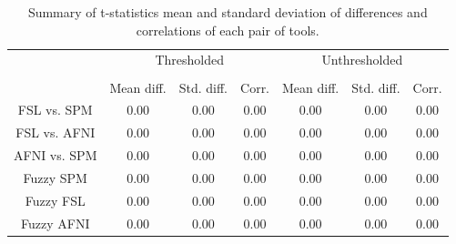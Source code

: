 \documentclass[runningheads]{llncs}
\begin{document}
\setlength{\tabcolsep}{10pt}
\begin{table}[h]
    \centering
    \begin{tabular}{cccc|ccc}
        \toprule
        \multirow{2}{*}{} & \multicolumn{3}{c}{Thresholded} & \multicolumn{3}{c}{Unthresholded} \\
        \cmidrule{2-4} \cmidrule{5-7} \\
        {} & Mean diff. & Std. diff. & Corr. & Mean diff. & Std. diff. & Corr.  \\
        \midrule
        \rowcolor{lightgray}
        FSL vs. SPM          &  0.00       & 0.00      & 0.00       & 0.00     & 0.00       & 0.00 \\
        \rowcolor{lightgray}
        FSL vs. AFNI         &  0.00       & 0.00      & 0.00       & 0.00     & 0.00       & 0.00 \\
        \rowcolor{lightgray}
        AFNI vs. SPM         &  0.00       & 0.00      & 0.00       & 0.00     & 0.00       & 0.00 \\
        Fuzzy SPM            &  0.00       & 0.00      & 0.00       & 0.00     & 0.00       & 0.00 \\
        Fuzzy FSL            &  0.00       & 0.00      & 0.00       & 0.00     & 0.00       & 0.00 \\
        Fuzzy AFNI           &  0.00       & 0.00      & 0.00       & 0.00     & 0.00       & 0.00 \\
        \bottomrule
    \end{tabular}
    \caption{Summary of t-statistics mean and standard deviation of differences and correlations of each pair of tools.}
    \label{table:pipeline-stats}
\end{table}
\end{document}
